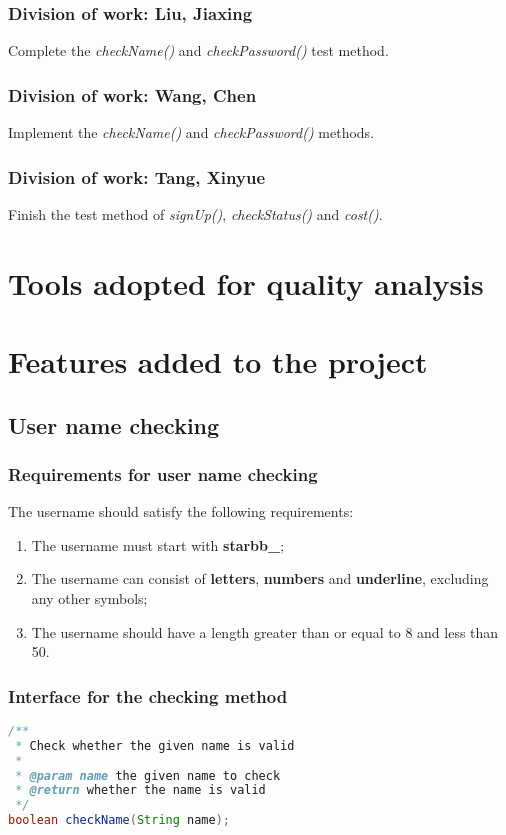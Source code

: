 \documentclass[a4paper]{report}
\begin{document}
\subsection{Division of work: Liu, Jiaxing}
Complete the \emph{checkName()} and \emph{checkPassword()} test method.
\subsection{Division of work: Wang, Chen}
Implement the \emph{checkName()} and \emph{checkPassword()} methods.
\subsection{Division of work: Tang, Xinyue}
Finish the test method of \emph{signUp()}, \emph{checkStatus()} and \emph{cost()}.
\chapter{Tools adopted for quality analysis}

\chapter{Features added to the project}
\section{User name checking}
\subsection{Requirements for user name checking}
The username should satisfy the following requirements:
\begin{enumerate}
\item The username must start with \textbf{starbb\_};
\item The username can consist of \textbf{letters}, \textbf{numbers} and \textbf{underline}, excluding any other symbols;
\item The username should have a length greater than or equal to 8 and less than 50.
\end{enumerate}
\subsection{Interface for the checking method}
\begin{lstlisting}[language=java]
/**
 * Check whether the given name is valid
 *
 * @param name the given name to check
 * @return whether the name is valid
 */
boolean checkName(String name);
\end{lstlisting}
\end{document}
